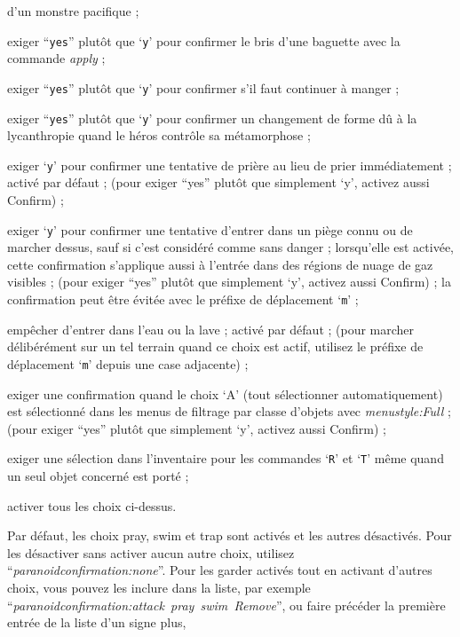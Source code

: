 \documentclass[titlepage]{article}
\begin{document}
\begin{description}[font=\mdseries\itshape]
\begin{description}[leftmargin=\pcwidth, topsep=1mm, itemsep=0mm, labelwidth=*, font=\ttfamily, align=right]
d'un monstre pacifique ;
\item[wand-break]
exiger ``\texttt{yes}'' plutôt que `\texttt{y}' pour confirmer le bris
d'une baguette avec la commande \textit{apply} ;
\item[eating]
exiger ``\texttt{yes}'' plutôt que `\texttt{y}' pour confirmer s'il faut
continuer à manger ;
\item[Were-change]
exiger ``\texttt{yes}'' plutôt que `\texttt{y}' pour confirmer un changement de forme dû
à la lycanthropie quand le héros contrôle sa métamorphose ;
\item[pray]
exiger `\texttt{y}' pour confirmer une tentative de prière au lieu
de prier immédiatement ; activé par défaut ;
(pour exiger ``yes'' plutôt que simplement `y', activez aussi Confirm) ;
\item[trap]
exiger `\texttt{y}' pour confirmer une tentative d'entrer dans un piège connu ou de marcher dessus,
sauf si c'est considéré comme sans danger ;
lorsqu'elle est activée, cette confirmation s'applique aussi à l'entrée dans des
régions de nuage de gaz visibles ;
(pour exiger ``yes'' plutôt que simplement `y', activez aussi Confirm) ;
la confirmation peut être évitée avec le préfixe de déplacement `\texttt{m}' ;
\item[swim]
empêcher d'entrer dans l'eau ou la lave ; activé par défaut ; (pour marcher
délibérément sur un tel terrain quand ce choix est actif, utilisez le préfixe
de déplacement `\texttt{m}' depuis une case adjacente) ;
\item[AutoAll]
exiger une confirmation quand le choix `A' (tout sélectionner automatiquement) est sélectionné
dans les menus de filtrage par classe d'objets avec \textit{menustyle:Full} ;
(pour exiger ``yes'' plutôt que simplement `y', activez aussi Confirm) ;
\item[Remove]
exiger une sélection dans l'inventaire pour les commandes `\texttt{R}' et `\texttt{T}'
même quand un seul objet concerné est porté ;
\item[all]
activer tous les choix ci-dessus.
\end{description}
Par défaut, les choix pray, swim et trap sont activés et les autres désactivés.
Pour les désactiver sans activer
aucun autre choix, utilisez ``\textit{paranoid\textunderscore confirmation:none}''.
Pour les garder activés tout en activant d'autres choix, vous pouvez
les inclure dans la liste, par exemple
``\textit{par\-a\-noid\textunderscore con\-fir\-ma\-tion:attack~pray~swim~Remove}'',
ou faire précéder la première entrée de la liste d'un signe plus,

\end{description}
\end{document}
